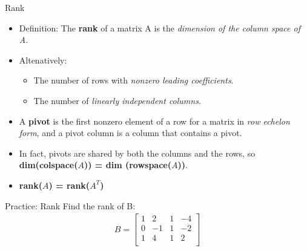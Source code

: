 \begin{frame}{Rank}
    \begin{itemize}
        \item Definition: The \textbf{rank} of a matrix A is the \textit{dimension of the column space of A}.
        \item Altenatively:
        \begin{itemize}
            \item The number of rows with \textit{nonzero leading coefficients}.
            \item The number of \textit{linearly independent columns}.
        \end{itemize}
        \item A \textbf{pivot} is the first nonzero element of a row for a matrix in \textit{row echelon form}, and a pivot column is a column that contains a pivot.
        \item In fact, pivots are shared by both the columns and the rows, so \textbf{dim(colspace($A$)) = dim (rowspace($A$))}.
        \item \textbf{rank($A$) = rank($A^T$)}
    \end{itemize}
\end{frame}

\begin{frame}{Practice: Rank}
    Find the rank of B:
    \begin{align*}
        B = \begin{bmatrix}
            1 & 2 & 1 & -4 \\
            0 & -1 & 1 & -2 \\
            1 &  4 & 1 & 2 \\
        \end{bmatrix}
    \end{align*}
\end{frame}

